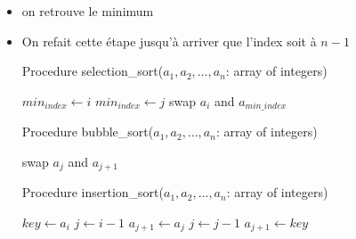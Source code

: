 \begin{itemize}
\begin{itemize}
\end{itemize}
\item on retrouve le minimum
\item On refait cette étape jusqu'à arriver que l'index soit à $n-1$
\begin{algorithm}
    \caption{Procedure selection\_sort($a_1, a_2, \dots, a_n$: array of integers)}
\begin{algorithmic}[1]
        \State $min_{index} \gets i$
                \State $min_{index} \gets j$
            \EndIf
        \EndFor
            \State swap $a_i$ and $a_{min\_index}$
        \EndIf
    \EndFor
\end{algorithmic}

\end{algorithm}

\begin{algorithm}
    \caption{Procedure bubble\_sort($a_1, a_2, \dots, a_n$: array of integers)}
\begin{algorithmic}[1]
                \State swap $a_j$ and $a_{j+1}$
            \EndIf
        \EndFor
    \EndFor
\end{algorithmic}

\end{algorithm}

\begin{algorithm}
    \caption{Procedure insertion\_sort($a_1, a_2, \dots, a_n$: array of integers)}
\begin{algorithmic}[1]
        \State $key \gets a_i$
        \State $j \gets i - 1$
            \State $a_{j+1} \gets a_j$
            \State $j \gets j - 1$
        \EndWhile
        \State $a_{j+1} \gets key$
    \EndFor
\end{algorithmic}

\end{algorithm}

\end{itemize}
